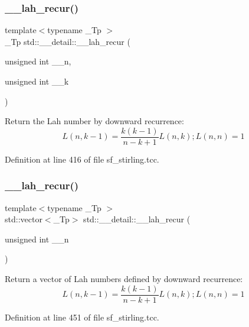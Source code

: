 \subsubsection{\texorpdfstring{\+\_\+\+\_\+lah\+\_\+recur()}{\_\_lah\_recur()}\hspace{0.1cm}{\footnotesize\ttfamily [1/2]}}
{\footnotesize\ttfamily template$<$typename \+\_\+\+Tp $>$ \\
\+\_\+\+Tp std\+::\+\_\+\+\_\+detail\+::\+\_\+\+\_\+lah\+\_\+recur (\begin{DoxyParamCaption}\item[{unsigned int}]{\+\_\+\+\_\+n,  }\item[{unsigned int}]{\+\_\+\+\_\+k }\end{DoxyParamCaption})}

Return the Lah number by downward recurrence\+: \[ L(n,k-1) = \frac{k(k-1)}{n-k+1}L(n,k); L(n,n) = 1 \] 

Definition at line 416 of file sf\+\_\+stirling.\+tcc.

\mbox{\label{namespacestd_1_1____detail_a335ad35b2674153db0fe4da6d025afae}} 
\subsubsection{\texorpdfstring{\+\_\+\+\_\+lah\+\_\+recur()}{\_\_lah\_recur()}\hspace{0.1cm}{\footnotesize\ttfamily [2/2]}}
{\footnotesize\ttfamily template$<$typename \+\_\+\+Tp $>$ \\
std\+::vector$<$\+\_\+\+Tp$>$ std\+::\+\_\+\+\_\+detail\+::\+\_\+\+\_\+lah\+\_\+recur (\begin{DoxyParamCaption}\item[{unsigned int}]{\+\_\+\+\_\+n }\end{DoxyParamCaption})}

Return a vector of Lah numbers defined by downward recurrence\+: \[ L(n,k-1) = \frac{k(k-1)}{n-k+1}L(n,k); L(n,n) = 1 \] 

Definition at line 451 of file sf\+\_\+stirling.\+tcc.

\mbox{\label{namespacestd_1_1____detail_a84722b82d6d614aa4653eb7559f7d508}} 
